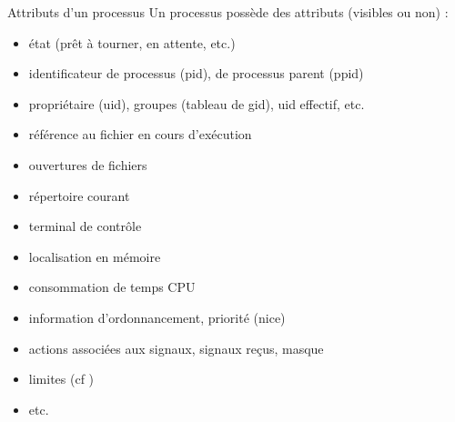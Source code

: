 \begin {frame} {Attributs d'un processus}
    Un processus possède des attributs (visibles ou non) :

    \begin {itemize}
	\fB
	\item état (prêt à tourner, en attente, etc.)
	\item identificateur de processus (pid), de processus parent (ppid)
	\item propriétaire (uid), groupes (tableau de gid), uid effectif, etc.
	\item référence au fichier en cours d'exécution
	\item ouvertures de fichiers
	\item répertoire courant
	\item terminal de contrôle
	\item localisation en mémoire
	\item consommation de temps CPU
	\item information d'ordonnancement, priorité (nice)
	\item actions associées aux signaux, signaux reçus, masque
	\item limites (cf )
	\item etc.
    \end {itemize}

\end {frame}




